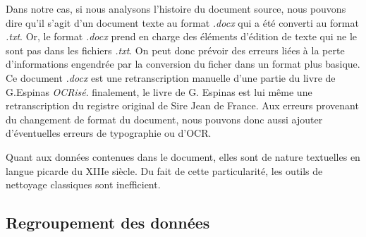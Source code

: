 Dans notre cas, si nous analysons \og l'histoire \fg{} du document source, nous pouvons dire qu'il s'agit d'un document texte au format \textit{.docx} qui  a été converti au format \textit{.txt}. Or, le format \textit{.docx} prend en charge des éléments d'édition de texte qui ne le sont pas dans les fichiers \textit{.txt}. On peut donc prévoir des erreurs liées à la perte d'informations engendrée par la conversion du ficher dans un format plus basique. 
Ce document \textit{.docx} est une retranscription manuelle d'une partie du livre de G.Espinas \textit{OCRisé}.
finalement, le livre de G. Espinas est lui même une retranscription du registre original de Sire Jean de France. Aux erreurs provenant du changement de format du document, nous pouvons donc aussi ajouter d'éventuelles erreurs de typographie ou d'OCR.

Quant aux données contenues dans le document, elles sont de nature textuelles en langue picarde du XIIIe siècle. Du fait de cette particularité, les outils de nettoyage classiques sont inefficient. %

\subsection{Regroupement des données}



